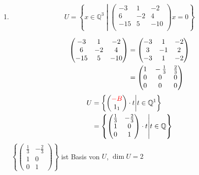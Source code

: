 \documentclass{article}
\newcommand{\tikzmark}[1]{\tikz[overlay,remember picture]{ \node (#1) {};}}
\begin{document}
\begin{enumerate}[1)]
\item
  \[
    U = \left\{
      x \in \mathbb{Q}^3
      \middle|
      \begin{pmatrix}
        -3  & 1  & -2  \\
        6   & -2 & 4   \\
        -15 & 5  & -10 \\
      \end{pmatrix}
      x = 0
    \right\}
  \]

  \begin{align*}
    \begin{pmatrix}
      -3  & 1  & -2  \\
      6   & -2 & 4   \\
      -15 & 5  & -10 \\
    \end{pmatrix}
    &=
    \begin{pmatrix}
      -3  & 1  & -2  \\
      3   & -1 & 2   \\
      -3 & 1  & -2 \\
    \end{pmatrix}\\
    &=
    \begin{pmatrix}
      1 & \tikzmark{l2} -\frac{1}{3} & \frac{2}{3} \\
      0 & 0                          & 0  \\
      0 & 0                          & 0 \tikzmark{r2}  \\
    \end{pmatrix}
  \end{align*}
    \begin{align*}
    U &= \left\{
      \begin{pmatrix}
        {\color{red} -B} \\
        1_1 \\
      \end{pmatrix}
      \cdot t
      \middle|
      t \in \mathbb{Q}^1
    \right\} \\
    &= \left\{
      \begin{pmatrix}
        \frac{1}{3} & -\frac{2}{3} \\
        1           & 0            \\
        0           & 1
      \end{pmatrix}
      \cdot t
      \middle|
      t \in \mathbb{Q}
    \right\} \\
  \end{align*}
  $\left\{      \begin{pmatrix}
        \frac{1}{3} & -\frac{2}{3} \\
        1           & 0            \\
        0           & 1
      \end{pmatrix}
   \right\}$ ist Basis von $U$, $\dim U = 2$
    

\end{enumerate}
\end{document}
